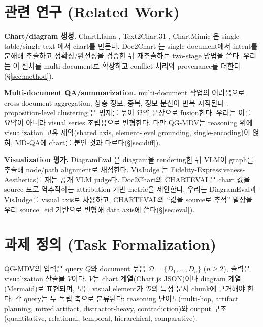 \documentclass[11pt]{article}
\begin{document}
\section{관련 연구 (Related Work)}

\textbf{Chart/diagram 생성.} ChartLlama \cite{han2023chartllama}, Text2Chart31
\cite{zadeh2024text2chart31}, ChartMimic \cite{yang2024chartmimic}은 single-table/single-text
에서 chart를 만든다. Doc2Chart \cite{jain2025doc2chart}는 single-document에서 intent를 분해해
추출하고 정확성/완전성을 검증한 뒤 재추출하는 two-stage 방법을 쓴다. 우리는 이 절차를
multi-document로 확장하고 conflict 처리와 provenance를 더한다(\S\ref{sec:method}).

\textbf{Multi-document QA/summarization.} multi-document 작업의 어려움으로 cross-document
aggregation, 상충 정보, 중복, 정보 분산이 반복 지적된다 \cite{ernst2022proposition,
tang2024multihoprag}. proposition-level clustering \cite{ernst2022proposition}은 명제를 묶어
요약 문장으로 fusion한다. 우리는 이를 요약이 아니라 visual series 조립용으로 변형한다. 다만
QG-MDV는 reasoning 위에 visualization 고유 제약(shared axis, element-level grounding,
single-encoding)이 얹혀, MD-QA에 chart를 붙인 것과 다르다(\S\ref{sec:diff}).

\textbf{Visualization 평가.} DiagramEval \cite{liang2025diagrameval}은 diagram을 rendering한 뒤
VLM이 graph를 추출해 node/path alignment로 채점한다. VisJudge \cite{xie2025visjudge}는
Fidelity-Expressiveness-Aesthetics를 재는 공개 VLM judge다. Doc2Chart의 CHARTEVAL은 chart 값을
source 표로 역추적하는 attribution 기반 metric을 제안한다. 우리는 DiagramEval과 VisJudge를 visual
axis로 차용하고, CHARTEVAL의 ``값을 source로 추적'' 발상을 우리 source\_eid 기반으로 변형해 data
axis에 쓴다(\S\ref{sec:eval}).

\section{과제 정의 (Task Formalization)}

QG-MDV의 입력은 query $Q$와 document 묶음 $\mathcal{D}=\{D_1,\dots,D_n\}$ ($n\geq2$), 출력은
visualization 산출물 $V$이다. $V$는 chart 계열(Chart.js JSON)이나 diagram 계열(Mermaid)로
표현되며, 모든 visual element가 $\mathcal{D}$의 특정 문서 chunk에 근거해야 한다. 각 query는 두
독립 축으로 분류된다: reasoning 난이도(multi-hop, artifact planning, mixed artifact,
distractor-heavy, contradiction)와 output 구조(quantitative, relational, temporal,
hierarchical, comparative).
\end{document}
